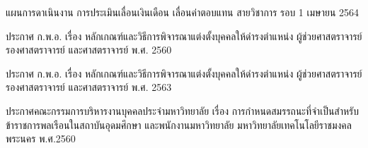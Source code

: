 \documentclass[a4paper,12pt,english]{sphinxmanual}
\begin{document}
 แผนการดาเนินงาน การประเมินเลื่อนเงินเดือน เลื่อนค่าตอบแทน สายวิชาการ รอบ 1 เมษายน 2564

 ประกาศ ก.พ.อ. เรื่อง หลักเกณฑ์และวิธีการพิจารณาแต่งตั้งบุคคลให้ดำรงตำแหน่ง ผู้ช่วยศาสตราจารย์ รองศาสตราจารย์ และศาสตราจารย์ พ.ศ. 2560

 ประกาศ ก.พ.อ. เรื่อง หลักเกณฑ์และวิธีการพิจารณาแต่งตั้งบุคคลให้ดำรงตำแหน่ง ผู้ช่วยศาสตราจารย์ รองศาสตราจารย์ และศาสตราจารย์ พ.ศ. 2563

 ประกาศคณะกรรมการบริหารงานบุคคลประจำมหาวิทยาลัย เรื่อง การกำหนดสมรรถนะที่จำเป็นสำหรับข้าราชการพลเรือนในสถาบันอุดมศึกษา และพนักงานมหาวิทยาลัย มหาวิทยาลัยเทคโนโลยีราชมงคลพระนคร พ.ศ.2560



\renewcommand{\indexname}{Index}
\printindex
\end{document}

